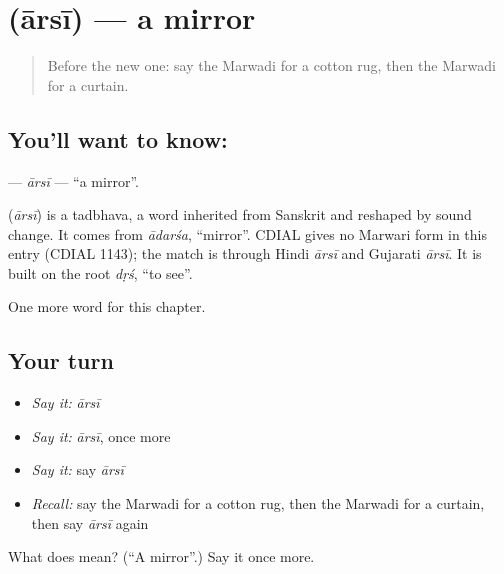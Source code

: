 \section[\texorpdfstring{\mw{आरसी} (ārsī)}{आरसी (ārsī)}]{ (ārsī) — a mirror}

\label{lesson:MW-C123-arsi}



\begin{quote}
Before the new one: say the Marwadi for a cotton rug, then the Marwadi for a curtain.
\end{quote}

\subsection*{You'll want to know: }
\textbf{} — \emph{ārsī} — \textquotedblleft{}a mirror\textquotedblright{}.

\begin{cousinweb}
\textbf{} (\emph{ārsī}) is a tadbhava, a word inherited from Sanskrit and reshaped by sound change. It comes from \emph{ādarśa}, \textquotedblleft{}mirror\textquotedblright{}. CDIAL gives no Marwari form in this entry (CDIAL 1143); the match is through Hindi \emph{ārsī} and Gujarati \emph{ārsī}. It is built on the root \emph{dṛś}, \textquotedblleft{}to see\textquotedblright{}.
\end{cousinweb}

\begin{grammarlens}[title={What you've built}]
One more word for this chapter.
\end{grammarlens}

\subsection*{Your turn}
\begin{itemize}
\raggedright
  \item \emph{Say it:} \emph{ārsī}
  \item \emph{Say it:} \emph{ārsī}, once more
  \item \emph{Say it:} say \emph{ārsī}
  \item \emph{Recall:} say the Marwadi for a cotton rug, then the Marwadi for a curtain, then say \emph{ārsī} again
\end{itemize}

\begin{tcolorbox}[breakable,colback=teal!4,colframe=teal!35!black,title={Before you move on}]
What does  mean? (\textquotedblleft{}A mirror\textquotedblright{}.) Say it once more.
\end{tcolorbox}
